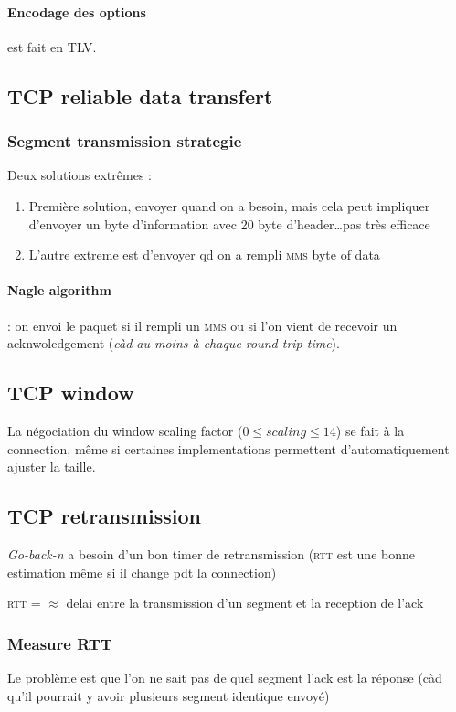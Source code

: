 \documentclass{report}
\begin{document}
\paragraph{Encodage des options} est fait en \textsc{TLV}.

\subsection{TCP reliable data transfert}

\subsubsection{Segment transmission strategie}

Deux solutions extrêmes :
\begin{enumerate}
    \item Première solution, envoyer quand on a besoin, mais cela peut impliquer d'envoyer
        un byte d'information avec 20 byte d'header\ldots pas très efficace
    \item L'autre extreme est d'envoyer qd on a rempli \textsc{mms} byte of data
\end{enumerate}

\paragraph{Nagle  algorithm}  :   on  envoi  le  paquet   si  il  rempli
un  \textsc{mms}  ou  si  l'on  vient  de  recevoir  un  acknwoledgement
(\textit{càd au moins à chaque round trip time}).

\subsection{TCP window}

La négociation du  window scaling factor ($0 \leq scaling  \leq 14$) se
fait  à la  connection, même  si certaines  implementations permettent
d'automatiquement ajuster la taille.

\subsection{TCP retransmission}
\textit{Go-back-n} a besoin d'un bon timer de retransmission (\textsc{rtt} est une
bonne estimation même si il change pdt la connection)

\textsc{rtt} = $\approx$ delai entre la transmission d'un segment et la reception de l'ack
\subsubsection{Measure RTT }
Le problème est que l'on ne sait pas de quel segment l'ack est la réponse (càd qu'il pourrait
y avoir plusieurs segment identique envoyé)
\end{document}
